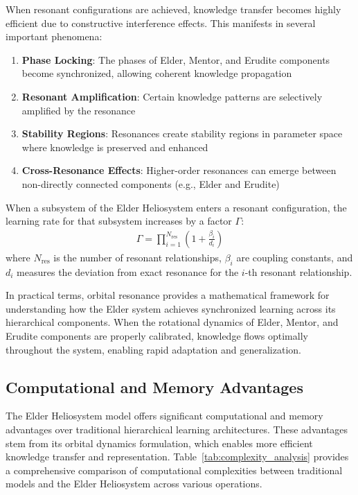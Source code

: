 When resonant configurations are achieved, knowledge transfer becomes highly efficient due to constructive interference effects. This manifests in several important phenomena:

\begin{enumerate}
    \item \textbf{Phase Locking}: The phases of Elder, Mentor, and Erudite components become synchronized, allowing coherent knowledge propagation
    \item \textbf{Resonant Amplification}: Certain knowledge patterns are selectively amplified by the resonance
    \item \textbf{Stability Regions}: Resonances create stability regions in parameter space where knowledge is preserved and enhanced
    \item \textbf{Cross-Resonance Effects}: Higher-order resonances can emerge between non-directly connected components (e.g., Elder and Erudite)
\end{enumerate}

\begin{corollary}
When a subsystem of the Elder Heliosystem enters a resonant configuration, the learning rate for that subsystem increases by a factor $\Gamma$:
\begin{align}
\Gamma = \prod_{i=1}^{N_{\text{res}}} \left(1 + \frac{\beta_i}{d_i}\right)
\end{align}
where $N_{\text{res}}$ is the number of resonant relationships, $\beta_i$ are coupling constants, and $d_i$ measures the deviation from exact resonance for the $i$-th resonant relationship.
\end{corollary}

In practical terms, orbital resonance provides a mathematical framework for understanding how the Elder system achieves synchronized learning across its hierarchical components. When the rotational dynamics of Elder, Mentor, and Erudite components are properly calibrated, knowledge flows optimally throughout the system, enabling rapid adaptation and generalization.

\subsection{Computational and Memory Advantages}

The Elder Heliosystem model offers significant computational and memory advantages over traditional hierarchical learning architectures. These advantages stem from its orbital dynamics formulation, which enables more efficient knowledge transfer and representation. Table~\ref{tab:complexity_analysis} provides a comprehensive comparison of computational complexities between traditional models and the Elder Heliosystem across various operations.

